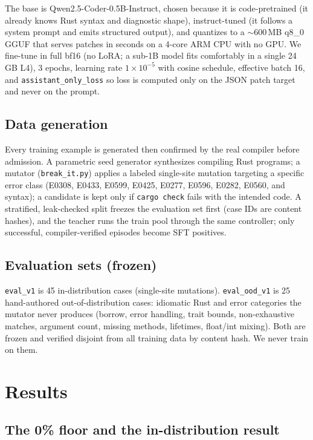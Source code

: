 \documentclass[10pt,twocolumn]{article}
\begin{document}
The base is Qwen2.5-Coder-0.5B-Instruct, chosen because it is code-pretrained
(it already knows Rust syntax and diagnostic shape), instruct-tuned (it follows a
system prompt and emits structured output), and quantizes to a $\sim$600\,MB q8\_0
GGUF that serves patches in seconds on a 4-core ARM CPU with no GPU. We fine-tune
in full bf16 (no LoRA; a sub-1B model fits comfortably in a single 24\,GB L4),
3 epochs, learning rate $1\times10^{-5}$ with cosine schedule, effective batch 16,
and \texttt{assistant\_only\_loss} so loss is computed only on the JSON patch
target and never on the prompt.

\subsection{Data generation}

Every training example is generated then confirmed by the real compiler before
admission. A parametric seed generator synthesizes compiling Rust programs; a
mutator (\texttt{break\_it.py}) applies a labeled single-site mutation targeting a
specific error class (E0308, E0433, E0599, E0425, E0277, E0596, E0282, E0560, and
syntax); a candidate is kept only if \texttt{cargo check} fails with the intended
code. A stratified, leak-checked split freezes the evaluation set first (case IDs
are content hashes), and the teacher runs the train pool through the same
controller; only successful, compiler-verified episodes become SFT positives.

\subsection{Evaluation sets (frozen)}

\texttt{eval\_v1} is 45 in-distribution cases (single-site mutations).
\texttt{eval\_ood\_v1} is 25 hand-authored out-of-distribution cases: idiomatic
Rust and error categories the mutator never produces (borrow, error handling,
trait bounds, non-exhaustive matches, argument count, missing methods, lifetimes,
float/int mixing). Both are frozen and verified disjoint from all training data
by content hash. We never train on them.

\section{Results}

\subsection{The 0\% floor and the in-distribution result}
\end{document}
